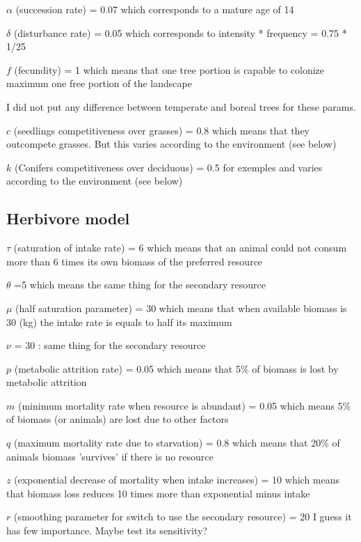 $\alpha$ (succession rate) = 0.07 which corresponds to a mature age of 14

\noindent $\delta$ (disturbance rate) = 0.05 which corresponds to intensity * frequency = 0.75 * 1/25

\noindent $f$ (fecundity) = 1 which means that one tree portion is capable to colonize maximum one free portion of the landscape

\noindent I did not put any difference between temperate and boreal trees for these params.

\noindent $c$ (seedlings competitiveness over grasses) = 0.8 which means that they outcompete grasses. But this varies according to the environment (see below)

\noindent $k$ (Conifers competitiveness over deciduous) = 0.5 for exemples and varies according to the environment (see below)


\subsection*{Herbivore model}

$\tau$ (saturation of intake rate) = 6 which means that an animal could not consum more than 6 times its own biomass of the preferred resource

\noindent $\theta$ =5 which means the same thing for the secondary resource

\noindent $\mu$ (half saturation parameter) = 30 which means that when available biomass is 30 (kg) the intake rate is equals to half its maximum

\noindent $\nu$ = 30 : same thing for the secondary resource

\noindent $p$ (metabolic attrition rate) = 0.05 which means that 5\% of biomass is lost by metabolic attrition

\noindent $m$ (minimum mortality rate when resource is abundant) = 0.05 which means 5\% of biomass (or animals) are lost due to other factors 

\noindent $q$ (maximum mortality rate due to starvation) = 0.8 which means that 20\% of animals biomass 'survives' if there is no resource

\noindent $z$ (exponential decrease of mortality when intake increases) = 10 which means that biomass loss reduces 10 times more than exponential minus intake

\noindent $r$ (smoothing parameter for switch to use the secondary resource) = 20 I guess it has few importance. Maybe test its sensitivity?

